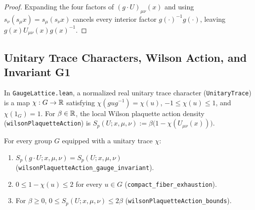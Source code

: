 \begin{proof}
Expanding the four factors of $(g \cdot U)_{\mu\nu}(x)$ and using $s_\nu(s_\mu x) = s_\mu(s_\nu x)$ cancels every interior factor $g(\cdot)^{-1} g(\cdot)$, leaving $g(x) U_{\mu\nu}(x) g(x)^{-1}$.
\end{proof}

\subsection{Unitary Trace Characters, Wilson Action, and Invariant G1}
In \texttt{GaugeLattice.lean}, a normalized real unitary trace character (\texttt{UnitaryTrace}) is a map $\chi : G \to \mathbb{R}$ satisfying $\chi(g u g^{-1}) = \chi(u)$, $-1 \le \chi(u) \le 1$, and $\chi(1_G) = 1$. For $\beta \in \mathbb{R}$, the local Wilson plaquette action density (\texttt{wilsonPlaquetteAction}) is $S_p(U; x, \mu, \nu) := \beta \big(1 - \chi(U_{\mu\nu}(x))\big)$.

\begin{theorem}
For every group $G$ equipped with a unitary trace $\chi$:
\begin{enumerate}
    \item $S_p(g \cdot U; x, \mu, \nu) = S_p(U; x, \mu, \nu)$ (\texttt{wilsonPlaquetteAction\_gauge\_invariant}).
    \item $0 \le 1 - \chi(u) \le 2$ for every $u \in G$ (\texttt{compact\_fiber\_exhaustion}).
    \item For $\beta \ge 0$, $0 \le S_p(U; x, \mu, \nu) \le 2\beta$ (\texttt{wilsonPlaquetteAction\_bounds}).
\end{enumerate}
\end{theorem}
